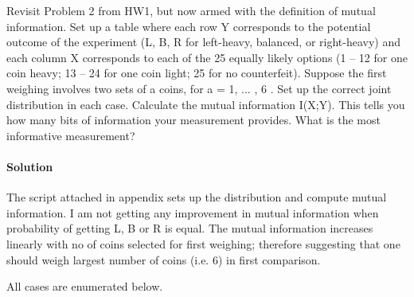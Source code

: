 \documentclass[]{article}
\begin{document}
Revisit Problem 2 from HW1, but now armed with the definition of mutual
information. Set up a table where each row Y corresponds to the potential
outcome of the experiment (L, B, R for left-heavy, balanced, or right-heavy) and
each column X corresponds to each of the 25 equally likely options (1 – 12 for
one coin heavy; 13 – 24 for one coin light; 25 for no counterfeit).  Suppose the
first weighing involves two sets of a coins, for a = 1, ... , 6 . Set up the
correct joint distribution in each case. Calculate the mutual information
I(X;Y). This tells you how many bits of information your measurement provides.
What is the most informative measurement?

\paragraph{Solution}

The script attached in appendix sets up the distribution and compute mutual
information. I am not getting any improvement in mutual information when
probability of getting L, B or R is equal. The mutual information increases
linearly with no of coins selected for first weighing; therefore suggesting that
one should weigh largest number of coins (i.e. 6) in first comparison.

All cases are enumerated below.




\end{document}

